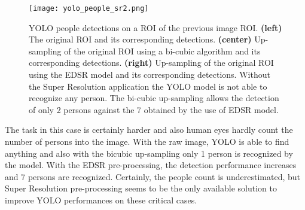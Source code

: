 \documentclass{standalone}
\begin{document}
\begin{figure}[htbp]
\centering
\texttt{[image: yolo\_people\_sr2.png]}
\caption{YOLO people detections on a ROI of the previous image ROI.
\textbf{(left)} The original ROI and its corresponding detections.
\textbf{(center)} Up-sampling of the original ROI using a bi-cubic algorithm and its corresponding detections.
\textbf{(right)} Up-sampling of the original ROI using the EDSR model and its corresponding detections.
Without the Super Resolution application the YOLO model is not able to recognize any person.
The bi-cubic up-sampling allows the detection of only 2 persons against the 7 obtained by the use of EDSR model.
}
\label{fig:yolo_sr2}
\end{figure}

The task in this case is certainly harder and also human eyes hardly count the number of persons into the image.
With the raw image, YOLO is able to find anything and also with the bicubic up-sampling only 1 person is recognized by the model.
With the EDSR pre-processing, the detection performance increases and $7$ persons are recognized.
Certainly, the people count is underestimated, but Super Resolution pre-processing seems to be the only available solution to improve YOLO performances on these critical cases.
\end{document}
